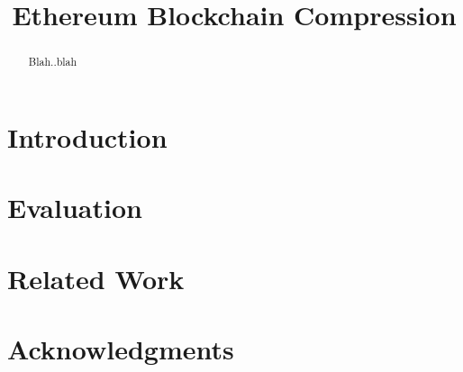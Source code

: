 \documentclass[10pt,numbers]{sigplanconf}
\theoremstyle{definition}
\begin{document}
\allowdisplaybreaks[1]





\title{Ethereum Blockchain Compression}
\maketitle
\begin{abstract}
Blah..blah
\end{abstract}



\section{Introduction} \label{sec:intro}





\section{Evaluation}\label{sec:evaluation}

\section{Related Work} \label{sec:related}



\section*{Acknowledgments}




\appendix
\end{document}
